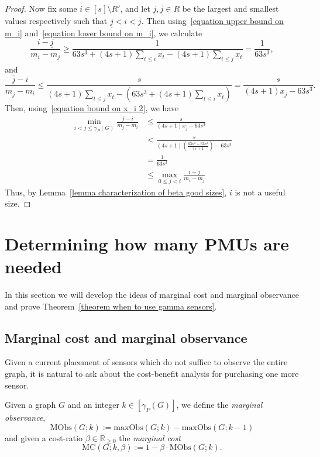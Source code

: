 \documentclass{article}
\begin{document}
\begin{proof}
            Now fix some $i\in [s]\setminus R'$, and let $\underline{j},\overline{j}\in R$ be the largest and smallest values respectively such that $\underline{j}<i<\overline{j}$.
            Then using~\eqref{equation upper bound on m_i} and~\eqref{equation lower bound on m_i}, we calculate
                \[ \frac{i-\underline{j}}{m_i-m_{\underline{j}}}\geq \frac{1}{63s^3+ (4s+1)\displaystyle\sum_{t\leq i} x_t-(4s+1)\sum_{t\leq \underline{j}}x_t}=\frac{1}{63s^3}, \]
            and
                \[ \frac{\overline{j}-i}{m_{\overline{j}}-m_i}\leq \frac{s}{(4s+1)\displaystyle\sum_{t\leq \overline{j}}x_t-\left(63s^3+ (4s+1)\displaystyle\sum_{t\leq i} x_t\right)}=\frac{s}{(4s+1)x_{\overline{j}}-63s^3}. \]
            Then, using~\eqref{equation bound on x_i 2}, we have 
            \begin{align*}
                \min_{i<j\leq \gamma_P(G)}\frac{j-i}{m_j-m_i} &\leq \frac{s}{(4s+1)x_{\overline{j}}-63s^3} \\
            & < \frac{s}{(4s+1)\left(\displaystyle\frac{63s^4+63s^3}{4s+1}\right)-63s^3} \\
            & =\frac{1}{63s^3} \\
            & \leq\max_{0\leq j<i}\frac{i-j}{m_i-m_j}
            \end{align*}
            Thus, by Lemma~\ref{lemma characterization of beta good sizes}, $i$ is not a useful size.
            
        \end{proof}
 
\section{Determining how many PMUs are needed}\label{section marginal cost}
    In this section we will develop the ideas of marginal cost and marginal observance and prove Theorem~\ref{theorem when to use gamma sensors}.
    
    \subsection{Marginal cost and marginal observance}
        Given a current placement of sensors which do not suffice to observe the entire graph, it is natural to ask about the cost-benefit analysis for purchasing one more sensor.
        
        Given a graph $G$ and an integer $k\in [\gamma_P(G)]$, we define the \emph{marginal observance}, 
            \[ \mathrm{MObs}(G;k):=\mathrm{maxObs}(G;k)-\mathrm{maxObs}(G;k-1) \]
        and given a cost-ratio $\beta\in\mathbb{R}_{\geq 0}$ the \emph{marginal cost}
            \[ \textrm{MC}(G;k,\beta):=1-\beta\cdot\textrm{MObs}(G;k). \]
        
\end{document}

